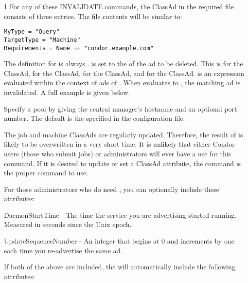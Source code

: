 \begin{ManPage}{\label{man-condor-advertise}}{1}
For any of these INVALIDATE commands, the ClassAd in the required file
consists of three entries.
The file contents will be similar to:
\begin{verbatim}
MyType = "Query"
TargetType = "Machine"
Requirements = Name == "condor.example.com"
\end{verbatim}
The definition for  is always .
 is set to the  of the ad to be deleted.
This  is
 for the  ClassAd,
 for the  ClassAd,
 for the  ClassAd, and
 for the  ClassAd.
 is an expression evaluated within the context
of ads of .
When  evaluates to ,
the matching ad is invalidated.  
A full example is given below.


\begin{Options}
    \ToolArgsBaseDesc
            {Specify a pool by
            giving the central manager's hostname and an optional port
	    number.  The default is the
	     specified in the configuration file.}
\end{Options}

\GenRem
The job and machine ClassAds are regularly updated.
Therefore, the result of  is likely to be
overwritten in a very short time.
It is unlikely that either Condor users (those who submit jobs)
or administrators will ever have a use for this command.
If it is desired to update or set a ClassAd attribute, the
 command is the proper command to use.

For those administrators who do need , you can 
optionally include these attributes:

DaemonStartTime - The time the service you are advertising
started running.  Measured in seconds since the Unix epoch.

UpdateSequenceNumber - An integer that begins at 0 and increments by
one each time you re-advertise the same ad.

If both of the above are included, the  will
automatically include the following attributes:


\end{ManPage}
